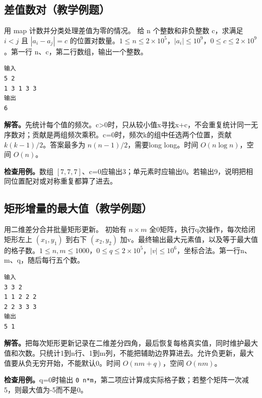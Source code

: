 \subsection{差值数对（教学例题）}
用 map 计数并分类处理差值为零的情况。
给 n 个整数和非负整数 c，求满足 $i<j$ 且 $|a_i-a_j|=c$ 的位置对数量。$1\le n\le2\times10^5$，$|a_i|\le10^9$，$0\le c\le2\times10^9$。第一行 n、c，第二行数组，输出一个整数。
\begin{verbatim}
输入
5 2
1 3 1 3 3
输出
6
\end{verbatim}

\noindent\textbf{解答。}先统计每个值的频次。c>0时，只从较小值x寻找x+c，不会重复统计同一无序数对；贡献是两组频次乘积。c=0时，频次k的组中任选两个位置，贡献 $k(k-1)/2$。答案最多为 $n(n-1)/2$，需要long long。时间 $O(n\log n)$，空间 $O(n)$。

\noindent\textbf{检查用例。}数组 $[7,7,7]$、c=0应输出3；单元素时应输出0。若输出9，说明把相同位置配对或对称重复都算了进去。

\subsection{矩形增量的最大值（教学例题）}
用二维差分合并批量矩形更新。
初始有 $n\times m$ 全0矩阵，执行q次操作，每次给闭矩形左上 $(x_1,y_1)$ 到右下 $(x_2,y_2)$ 加v。最终输出最大元素值，以及等于最大值的格子数。$1\le n,m\le1000$，$0\le q\le2\times10^5$，$|v|\le10^6$，坐标合法。第一行n、m、q，随后每行五个数。
\begin{verbatim}
输入
3 3 2
1 1 2 2 2
2 2 3 3 3
输出
5 1
\end{verbatim}

\noindent\textbf{解答。}把每次矩形更新记录在二维差分四角，最后恢复每格真实值，同时维护最大值和次数。只统计1到n行、1到m列，不能把辅助边界算进去。允许负更新，最大值要从负无穷开始，不能默认0。时间 $O(nm+q)$，空间 $O(nm)$。

\noindent\textbf{检查用例。}q=0时输出 \texttt{0 n*m}，第二项应计算成实际格子数；若整个矩阵一次减5，则最大值为-5而不是0。
